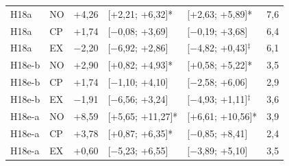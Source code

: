 \begin{table}[H]
\begin{tabular}{@{}llrllr@{}}
H18a & NO & +4{,}26 & [+2{,}21; +6{,}32]* & [+2{,}63; +5{,}89]* & 7{,}6 \\
H18a & CP & +1{,}74 & [$-$0{,}08; +3{,}69] & [$-$0{,}19; +3{,}68] & 6{,}4 \\
H18a & EX & $-$2{,}20 & [$-$6{,}92; +2{,}86] & [$-$4{,}82; +0{,}43]$^\ddagger$ & 6{,}1 \\
\midrule
H18e-b & NO & +2{,}90 & [+0{,}82; +4{,}93]* & [+0{,}58; +5{,}22]* & 3{,}5 \\
H18e-b & CP & +1{,}74 & [$-$1{,}10; +4{,}10] & [$-$2{,}58; +6{,}06] & 2{,}9 \\
H18e-b & EX & $-$1{,}91 & [$-$6{,}56; +3{,}24] & [$-$4{,}93; +1{,}11]$^\ddagger$ & 3{,}6 \\
H18e-a & NO & +8{,}59 & [+5{,}65; +11{,}27]* & [+6{,}61; +10{,}56]* & 3{,}9 \\
H18e-a & CP & +3{,}78 & [+0{,}87; +6{,}35]* & [$-$0{,}85; +8{,}41] & 2{,}4 \\
H18e-a & EX & +0{,}60 & [$-$5{,}23; +6{,}55] & [$-$3{,}89; +5{,}10] & 3{,}5 \\
\bottomrule\end{tabular}\end{table}
